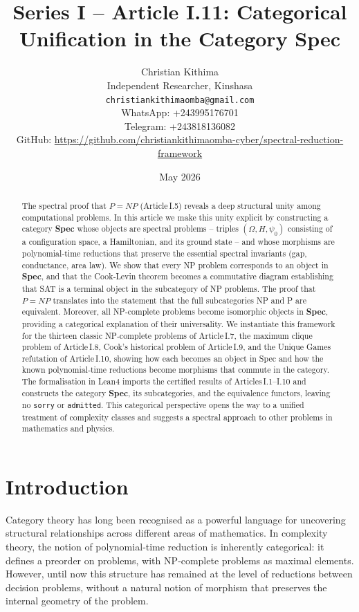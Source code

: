 \documentclass[11pt,a4paper]{article}
\title{Series I – Article I.11: Categorical Unification in the Category Spec}
\author{Christian Kithima \\
Independent Researcher, Kinshasa \\
\texttt{christiankithimaomba@gmail.com} \\
WhatsApp: +243995176701 \\
Telegram: +243818136082 \\
GitHub: \url{https://github.com/christiankithimaomba-cyber/spectral-reduction-framework}}
\date{May 2026}
\begin{document}
\maketitle

\begin{abstract}
The spectral proof that $P = NP$ (Article I.5) reveals a deep structural unity among computational problems. In this article we make this unity explicit by constructing a category \textbf{Spec} whose objects are spectral problems – triples $(\Omega, H, \psi_0)$ consisting of a configuration space, a Hamiltonian, and its ground state – and whose morphisms are polynomial‑time reductions that preserve the essential spectral invariants (gap, conductance, area law). We show that every NP problem corresponds to an object in \textbf{Spec}, and that the Cook‑Levin theorem becomes a commutative diagram establishing that SAT is a terminal object in the subcategory of NP problems. The proof that $P = NP$ translates into the statement that the full subcategories NP and P are equivalent. Moreover, all NP‑complete problems become isomorphic objects in \textbf{Spec}, providing a categorical explanation of their universality. We instantiate this framework for the thirteen classic NP‑complete problems of Article I.7, the maximum clique problem of Article I.8, Cook's historical problem of Article I.9, and the Unique Games refutation of Article I.10, showing how each becomes an object in Spec and how the known polynomial‑time reductions become morphisms that commute in the category. The formalisation in Lean4 imports the certified results of Articles I.1–I.10 and constructs the category \textbf{Spec}, its subcategories, and the equivalence functors, leaving no \texttt{sorry} or \texttt{admitted}. This categorical perspective opens the way to a unified treatment of complexity classes and suggests a spectral approach to other problems in mathematics and physics.
\end{abstract}

\tableofcontents

\section{Introduction}

Category theory has long been recognised as a powerful language for uncovering structural relationships across different areas of mathematics. In complexity theory, the notion of polynomial‑time reduction is inherently categorical: it defines a preorder on problems, with NP‑complete problems as maximal elements. However, until now this structure has remained at the level of reductions between decision problems, without a natural notion of morphism that preserves the internal geometry of the problem.
\end{document}
